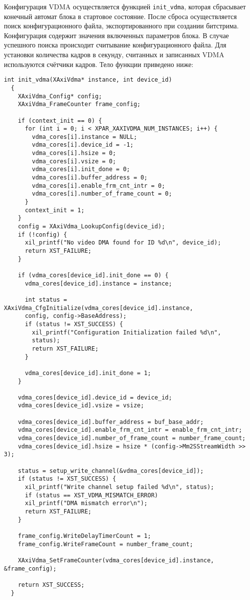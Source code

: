 Конфигурация VDMA осуществляется функцией \texttt{init\_vdma},
которая сбрасывает конечный автомат блока в стартовое состояние. После сброса
осуществляется поиск конфигурационного файла, экспортированного при создании битстрима.
Конфигурация содержит значения включенных параметров блока. В случае успешного поиска
происходит считывание конфигурационного файла. Для установки количества кадров в секунду,
считанных и записанных VDMA используются счётчики кадров. Тело функции приведено ниже:
\medskip
\begin{lstlisting}[style=C]
  int init_vdma(XAxiVdma* instance, int device_id)
  {
    XAxiVdma_Config* config;
    XAxiVdma_FrameCounter frame_config;

    if (context_init == 0) {
      for (int i = 0; i < XPAR_XAXIVDMA_NUM_INSTANCES; i++) {
        vdma_cores[i].instance = NULL;
        vdma_cores[i].device_id = -1;
        vdma_cores[i].hsize = 0;
        vdma_cores[i].vsize = 0;
        vdma_cores[i].init_done = 0;
        vdma_cores[i].buffer_address = 0;
        vdma_cores[i].enable_frm_cnt_intr = 0;
        vdma_cores[i].number_of_frame_count = 0;
      }
      context_init = 1;
    }
    config = XAxiVdma_LookupConfig(device_id);
    if (!config) {
      xil_printf("No video DMA found for ID %d\n", device_id);
      return XST_FAILURE;
    }

    if (vdma_cores[device_id].init_done == 0) {
      vdma_cores[device_id].instance = instance;

      int status = XAxiVdma_CfgInitialize(vdma_cores[device_id].instance,
      config, config->BaseAddress);
      if (status != XST_SUCCESS) {
        xil_printf("Configuration Initialization failed %d\n",
        status);
        return XST_FAILURE;
      }

      vdma_cores[device_id].init_done = 1;
    }

    vdma_cores[device_id].device_id = device_id;
    vdma_cores[device_id].vsize = vsize;

    vdma_cores[device_id].buffer_address = buf_base_addr;
    vdma_cores[device_id].enable_frm_cnt_intr = enable_frm_cnt_intr;
    vdma_cores[device_id].number_of_frame_count = number_frame_count;
    vdma_cores[device_id].hsize = hsize * (config->Mm2SStreamWidth >> 3);

    status = setup_write_channel(&vdma_cores[device_id]);
    if (status != XST_SUCCESS) {
      xil_printf("Write channel setup failed %d\n", status);
      if (status == XST_VDMA_MISMATCH_ERROR)
      xil_printf("DMA mismatch error\n");
      return XST_FAILURE;
    }

    frame_config.WriteDelayTimerCount = 1;
    frame_config.WriteFrameCount = number_frame_count;

    XAxiVdma_SetFrameCounter(vdma_cores[device_id].instance, &frame_config);

    return XST_SUCCESS;
  }
\end{lstlisting}
\medskip

